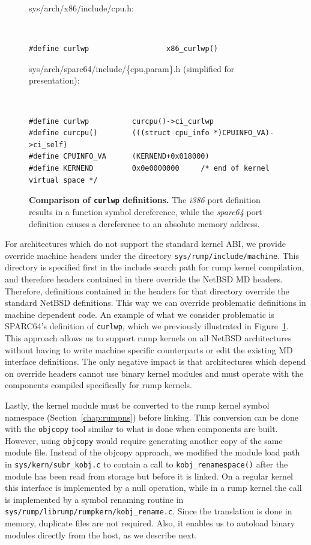 \begin{figure}[t]
\begin{flushleft}
sys/arch/x86/include/cpu.h:
{\tt \scriptsize  
\begin{verbatim}
#define curlwp                  x86_curlwp()
\end{verbatim}}

sys/arch/sparc64/include/\{cpu,param\}.h (simplified for presentation):
{\tt \scriptsize  
\begin{verbatim}
#define curlwp          curcpu()->ci_curlwp
#define curcpu()        (((struct cpu_info *)CPUINFO_VA)->ci_self)
#define CPUINFO_VA      (KERNEND+0x018000)
#define KERNEND         0x0e0000000     /* end of kernel virtual space */
\end{verbatim}}
\end{flushleft}
\caption[Comparison of \texttt{curlwp} definitions]{
\textbf{Comparison of \texttt{curlwp} definitions.}
The \textit{i386} port definition results in a function symbol
dereference, while the \textit{sparc64} port definition causes a
dereference to an absolute memory address.
}
\label{fig:curlwp}
\end{figure}

For architectures which do not support the standard kernel
ABI, we provide override machine headers under the directory
\texttt{sys/rump/include/machine}.  This directory is specified first
in the include search path for rump kernel compilation, and therefore
headers contained in there override the NetBSD MD headers.  Therefore,
definitions contained in the headers for that directory override the
standard NetBSD definitions.  This way we can override problematic
definitions in machine dependent code.  An example of what we consider
problematic is SPARC64's definition of \texttt{curlwp}, which we
previously illustrated in Figure~\ref{fig:curlwp}.  This approach
allows us to support rump kernels on all NetBSD architectures without
having to write machine specific counterparts or edit the existing MD
interface definitions.  The only negative impact is that architectures
which depend on override headers cannot use binary kernel modules and
must operate with the components compiled specifically for rump kernels.

Lastly, the kernel module must be converted to the rump kernel
symbol namespace (Section~\ref{chap:rumpns}) before linking.  This
conversion can be done with the \texttt{objcopy} tool similar to what is done
when components are built.  However, using \texttt{objcopy} would require generating
another copy of the same module file.  Instead of the objcopy
approach, we modified the module load path in
\verb+sys/kern/subr_kobj.c+ to contain a call to \verb+kobj_renamespace()+
after the module has been read from storage but before it is linked.
On a regular kernel this interface is implemented by a null operation,
while in a rump kernel the call is implemented by a symbol renaming
routine in \verb+sys/rump/librump/rumpkern/kobj_rename.c+.  Since
the translation is done in memory, duplicate files are not required.
Also, it enables us to autoload binary modules directly from the host, as
we describe next.

